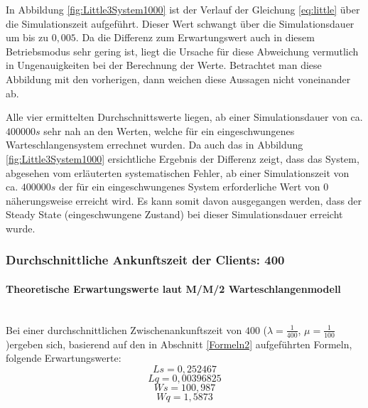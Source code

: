 In Abbildung \ref{fig:Little3System1000} ist der Verlauf der Gleichung \ref{eq:little} über die Simulationszeit aufgeführt.
Dieser Wert schwangt über die Simulationsdauer um bis zu $0,005$. Da die Differenz zum Erwartungswert auch in diesem Betriebsmodus sehr gering ist, liegt die Ursache für diese Abweichung vermutlich in Ungenauigkeiten bei der Berechnung der Werte. Betrachtet man diese Abbildung mit den vorherigen, dann weichen diese Aussagen nicht voneinander ab.

Alle vier ermittelten Durchschnittswerte liegen, ab einer Simulationsdauer von ca. $400000s$ sehr nah an den Werten, welche für ein eingeschwungenes Warteschlangensystem errechnet wurden. Da auch das in Abbildung  \ref{fig:Little3System1000} ersichtliche Ergebnis der Differenz zeigt, dass das System, abgesehen vom erläuterten systematischen Fehler, ab einer Simulationszeit von ca. $400000s$ der für ein eingeschwungenes System erforderliche Wert von $0$ näherungsweise erreicht wird. Es kann somit davon ausgegangen werden, dass der Steady State (eingeschwungene Zustand) bei dieser Simulationsdauer erreicht wurde.

\subsubsection{Durchschnittliche Ankunftszeit der Clients: 400}
\paragraph{Theoretische Erwartungswerte laut M/M/2 Warteschlangenmodell}
\\
Bei einer durchschnittlichen Zwischenankunftszeit von $400$ ($\lambda=\frac{1}{400}$, $\mu=\frac{1}{100}$)ergeben sich, basierend auf den in Abschnitt \ref{Formeln2} aufgeführten Formeln, folgende Erwartungswerte:
\begin{equation}
Ls=0,252467
\end{equation}
\begin{equation}
Lq=0,00396825
\end{equation}
\begin{equation}
Ws=100,987
\end{equation}
\begin{equation}
Wq=1,5873
\end{equation}

